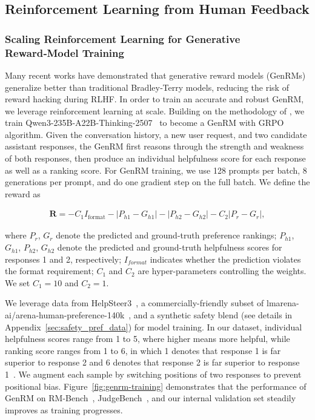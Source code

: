 \subsection{Reinforcement Learning from Human Feedback}
\label{subsec:RLHF}

\subsubsection{Scaling Reinforcement Learning for Generative Reward‑Model Training}
Many recent works \citep{deepseek-genrm,helpsteer3-pref,rmr1} have demonstrated that generative reward models (GenRMs) generalize better than traditional Bradley‑Terry models, reducing the risk of reward hacking during RLHF. In order to train an accurate and robust GenRM, we leverage reinforcement learning at scale. Building on the methodology of \citet{helpsteer3-pref}, we train Qwen3-235B-A22B-Thinking-2507~\citep{yang2025qwen3technicalreport} to become a GenRM with GRPO algorithm.  Given the conversation history, a new user request, and two candidate assistant responses, the GenRM first reasons through the strength and weakness of both responses, then produce an individual helpfulness score for each response as well as a ranking score. For GenRM training, we use 128 prompts per batch, 8 generations per prompt, and do one gradient step on the full batch. We define the reward as

\begin{align}
    \mathbf{R} = -C_1I_{\text{format}} -
    \left| P_{h1} - G_{h1} \right| - \left| P_{h2} - G_{h2} \right| - C_2 \left| P_r - G_r \right|,
\end{align}

where $P_r$, $G_r$ denote the predicted and ground-truth preference rankings; $P_{h1}$, $G_{h1}$, $P_{h2}$, $G_{h2}$ denote the predicted and ground-truth helpfulness scores for responses 1 and 2, respectively;  $I_{format}$ indicates whether the prediction violates the format requirement; $C_1$ and $C_2$ are hyper-parameters controlling the weights. We set $C_1=10$ and $C_2=1$. 

We leverage data from HelpSteer3~\citep{helpsteer3-pref}, a commercially-friendly subset of lmarena-ai/arena-human-preference-140k~\citep{chiang2024chatbot}, and a synthetic safety blend (see details in Appendix~\ref{sec:safety_pref_data}) for model training. In our dataset, individual helpfulness scores range from 1 to 5, where higher means more helpful, while ranking score ranges from 1 to 6, in which 1 denotes that response 1 is far superior to response 2 and 6 denotes that response 2 is far superior to response 1~\citep{helpsteer3-pref}. We augment each sample by switching positions of two responses to prevent positional bias. Figure~\ref{fig:genrm-training} demonstrates that the performance of GenRM on RM-Bench~\citep{rmbench}, JudgeBench~\citep{judgebench}, and our internal validation set steadily improves as training progresses.

